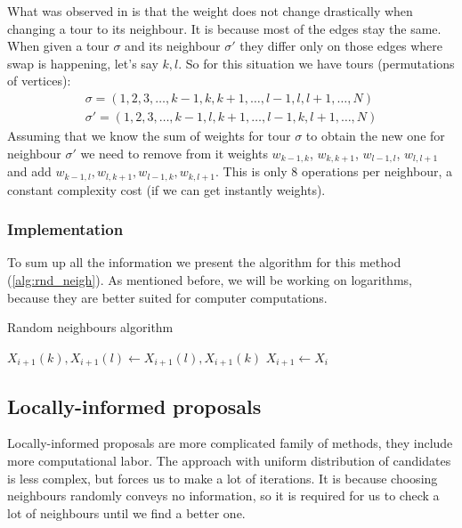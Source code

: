 		What was observed in \cite{decryption_tsp_MCMC} is that the weight does not change drastically when changing a tour to its neighbour. It is because most of the edges stay the same. When given a tour $\sigma$ and its neighbour $\sigma'$ they differ only on those edges where swap is happening, let's say $k,l$. So for this situation we have tours (permutations of vertices):
		\begin{align*}
			\sigma = (1, 2, 3, \ldots, k-1, k, k+1, \ldots, l-1, l, l+1, \ldots, N) \\
			\sigma' = (1, 2, 3, \ldots, k-1, l, k+1, \ldots, l-1, k, l+1, \ldots, N)
		\end{align*}
		Assuming that we know the sum of weights for tour $\sigma$ to obtain the new one for neighbour $\sigma'$ we need to remove from it weights $w_{k-1, k}$, $w_{k, k+1}$, $w_{l-1, l}$, $w_{l, l+1}$ and add $w_{k-1, l}, w_{l, k+1}, w_{l-1, k}, w_{k, l+1}$. This is only $8$ operations per neighbour, a constant complexity cost (if we can get instantly weights).
		
	\subsubsection{Implementation}
		To sum up all the information we present the algorithm for this method (\ref{alg:rnd_neigh}). As mentioned before, we will be working on logarithms, because they are better suited for computer computations.
		
		\begin{algorithm}
			\caption{Random neighbours algorithm}\label{alg:rnd_neigh}
			\begin{algorithmic}[1]
				
				\State $X_{i+1}(k), X_{i+1}(l) \gets X_{i+1}(l), X_{i+1}(k)$
				\Else
				\State $X_{i+1} \gets X_i$
				\EndIf
				\EndFor
			\end{algorithmic}
		\end{algorithm}

\subsection{Locally-informed proposals}
	Locally-informed proposals are more complicated family of methods, they include more computational labor. The approach with uniform distribution of candidates is less complex, but forces us to make a lot of iterations. It is because choosing neighbours randomly conveys no information, so it is required for us to check a lot of neighbours until we find a better one. 
	
